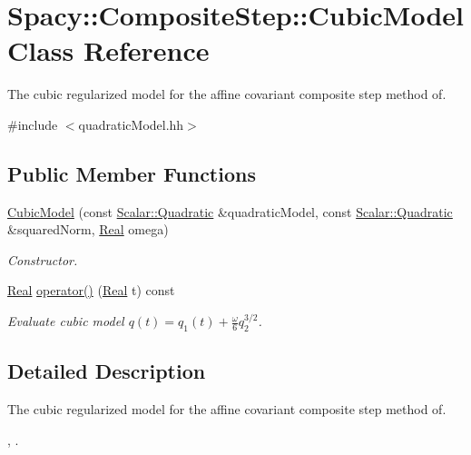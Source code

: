 \hypertarget{classSpacy_1_1CompositeStep_1_1CubicModel}{\section{\-Spacy\-:\-:\-Composite\-Step\-:\-:\-Cubic\-Model \-Class \-Reference}
\label{classSpacy_1_1CompositeStep_1_1CubicModel}
}


\-The cubic regularized model for the affine covariant composite step method of.  




{\ttfamily \#include $<$quadratic\-Model.\-hh$>$}

\subsection*{\-Public \-Member \-Functions}
\begin{DoxyCompactItemize}
\item 
\hyperlink{classSpacy_1_1CompositeStep_1_1CubicModel_aebf63b0a86934fd43bf1b2bc28821f25}{\-Cubic\-Model} (const \hyperlink{classSpacy_1_1Scalar_1_1Quadratic}{\-Scalar\-::\-Quadratic} \&quadratic\-Model, const \hyperlink{classSpacy_1_1Scalar_1_1Quadratic}{\-Scalar\-::\-Quadratic} \&squared\-Norm, \hyperlink{classSpacy_1_1Real}{\-Real} omega)
\begin{DoxyCompactList}\small\item\em \-Constructor. \end{DoxyCompactList}\item 
\hyperlink{classSpacy_1_1Real}{\-Real} \hyperlink{classSpacy_1_1CompositeStep_1_1CubicModel_a5669f387117cfdc47b5be45a29f387ce}{operator()} (\hyperlink{classSpacy_1_1Real}{\-Real} t) const 
\begin{DoxyCompactList}\small\item\em \-Evaluate cubic model $ q(t) = q_1(t) + \frac{\omega}{6}q_2^{3/2} $. \end{DoxyCompactList}\end{DoxyCompactItemize}


\subsection{\-Detailed \-Description}
\-The cubic regularized model for the affine covariant composite step method of. 

\cite{Lubkoll2015}, \cite{Lubkoll2015a}. 

